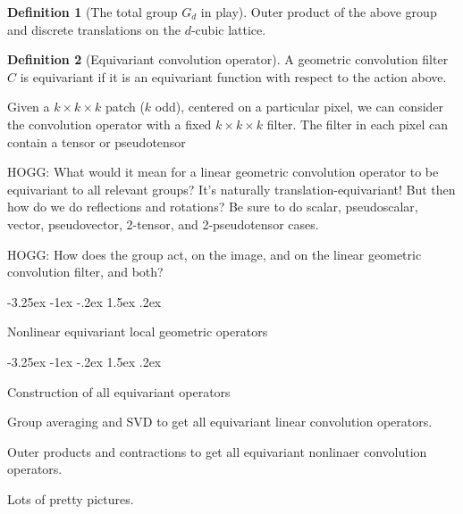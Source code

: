 \documentclass{article}
\makeatletter
\theoremstyle{definition}
\newtheorem{definition}{Definition}
\renewcommand\section{\@startsection {section}{1}{\z@}%
  {-3.25ex \@plus -1ex \@minus -.2ex}%
  {1.5ex \@plus .2ex}%
  {\raggedright\normalfont\large\bfseries}}
\makeatother
\begin{document}
\begin{definition}[The total group $G_d$ in play]
Outer product of the above group and discrete translations on the $d$-cubic lattice.
\end{definition}

\begin{definition}[Equivariant convolution operator]
A geometric convolution filter $C$ is equivariant if it is an equivariant function with respect to the action above. 
\end{definition}

Given a $k\times k \times k$ patch ($k$ odd), centered on a particular pixel, we can consider the convolution operator with a fixed $k\times k \times k$ filter. The filter in each pixel can contain a tensor or pseudotensor

HOGG: What would it mean for a linear geometric convolution operator to be equivariant to all relevant groups?
It's naturally translation-equivariant!
But then how do we do reflections and rotations?
Be sure to do scalar, pseudoscalar, vector, pseudovector, 2-tensor, and 2-pseudotensor cases.

HOGG: How does the group act, on the image, and on the linear geometric convolution filter, and both?

\section{Nonlinear equivariant local geometric operators}

\section{Construction of all equivariant operators}

Group averaging and SVD to get all equivariant linear convolution operators.

Outer products and contractions to get all equivariant nonlinaer convolution operators.

Lots of pretty pictures.
\end{document}
